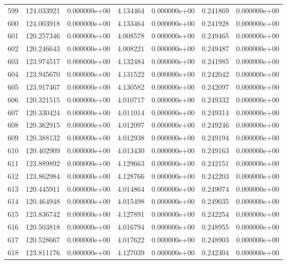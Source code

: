\begin{tabular}{rrrrrrr}
 599 & 124.033921 &  0.000000e+00 &  4.134464 &  0.000000e+00 &    0.241869 &  0.000000e+00 \\
 600 & 124.003918 &  0.000000e+00 &  4.133464 &  0.000000e+00 &    0.241928 &  0.000000e+00 \\
 601 & 120.257346 &  0.000000e+00 &  4.008578 &  0.000000e+00 &    0.249465 &  0.000000e+00 \\
 602 & 120.246643 &  0.000000e+00 &  4.008221 &  0.000000e+00 &    0.249487 &  0.000000e+00 \\
 603 & 123.974517 &  0.000000e+00 &  4.132484 &  0.000000e+00 &    0.241985 &  0.000000e+00 \\
 604 & 123.945670 &  0.000000e+00 &  4.131522 &  0.000000e+00 &    0.242042 &  0.000000e+00 \\
 605 & 123.917467 &  0.000000e+00 &  4.130582 &  0.000000e+00 &    0.242097 &  0.000000e+00 \\
 606 & 120.321515 &  0.000000e+00 &  4.010717 &  0.000000e+00 &    0.249332 &  0.000000e+00 \\
 607 & 120.330424 &  0.000000e+00 &  4.011014 &  0.000000e+00 &    0.249314 &  0.000000e+00 \\
 608 & 120.362915 &  0.000000e+00 &  4.012097 &  0.000000e+00 &    0.249246 &  0.000000e+00 \\
 609 & 120.388132 &  0.000000e+00 &  4.012938 &  0.000000e+00 &    0.249194 &  0.000000e+00 \\
 610 & 120.402909 &  0.000000e+00 &  4.013430 &  0.000000e+00 &    0.249163 &  0.000000e+00 \\
 611 & 123.889892 &  0.000000e+00 &  4.129663 &  0.000000e+00 &    0.242151 &  0.000000e+00 \\
 612 & 123.862984 &  0.000000e+00 &  4.128766 &  0.000000e+00 &    0.242203 &  0.000000e+00 \\
 613 & 120.445911 &  0.000000e+00 &  4.014864 &  0.000000e+00 &    0.249074 &  0.000000e+00 \\
 614 & 120.464948 &  0.000000e+00 &  4.015498 &  0.000000e+00 &    0.249035 &  0.000000e+00 \\
 615 & 123.836742 &  0.000000e+00 &  4.127891 &  0.000000e+00 &    0.242254 &  0.000000e+00 \\
 616 & 120.503818 &  0.000000e+00 &  4.016794 &  0.000000e+00 &    0.248955 &  0.000000e+00 \\
 617 & 120.528667 &  0.000000e+00 &  4.017622 &  0.000000e+00 &    0.248903 &  0.000000e+00 \\
 618 & 123.811176 &  0.000000e+00 &  4.127039 &  0.000000e+00 &    0.242304 &  0.000000e+00 \\

\end{tabular}
